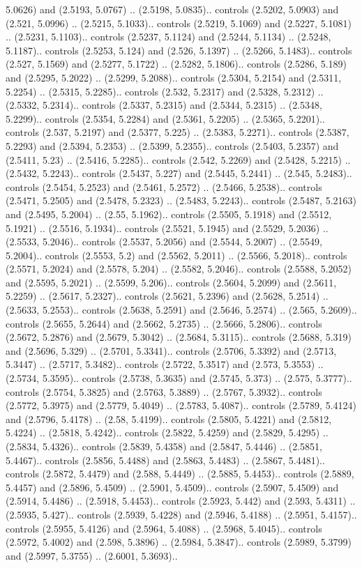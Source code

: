 5.0626) and (2.5193, 5.0767) .. (2.5198, 5.0835).. controls (2.5202, 5.0903) and (2.521, 5.0996) .. (2.5215, 5.1033).. controls (2.5219, 5.1069) and (2.5227, 5.1081) .. (2.5231, 5.1103).. controls (2.5237, 5.1124) and (2.5244, 5.1134) .. (2.5248, 5.1187).. controls (2.5253, 5.124) and (2.526, 5.1397) .. (2.5266, 5.1483).. controls (2.527, 5.1569) and (2.5277, 5.1722) .. (2.5282, 5.1806).. controls (2.5286, 5.189) and (2.5295, 5.2022) .. (2.5299, 5.2088).. controls (2.5304, 5.2154) and (2.5311, 5.2254) .. (2.5315, 5.2285).. controls (2.532, 5.2317) and (2.5328, 5.2312) .. (2.5332, 5.2314).. controls (2.5337, 5.2315) and (2.5344, 5.2315) .. (2.5348, 5.2299).. controls (2.5354, 5.2284) and (2.5361, 5.2205) .. (2.5365, 5.2201).. controls (2.537, 5.2197) and (2.5377, 5.225) .. (2.5383, 5.2271).. controls (2.5387, 5.2293) and (2.5394, 5.2353) .. (2.5399, 5.2355).. controls (2.5403, 5.2357) and (2.5411, 5.23) .. (2.5416, 5.2285).. controls (2.542, 5.2269) and (2.5428, 5.2215) .. (2.5432, 5.2243).. controls (2.5437, 5.227) and (2.5445, 5.2441) .. (2.545, 5.2483).. controls (2.5454, 5.2523) and (2.5461, 5.2572) .. (2.5466, 5.2538).. controls (2.5471, 5.2505) and (2.5478, 5.2323) .. (2.5483, 5.2243).. controls (2.5487, 5.2163) and (2.5495, 5.2004) .. (2.55, 5.1962).. controls (2.5505, 5.1918) and (2.5512, 5.1921) .. (2.5516, 5.1934).. controls (2.5521, 5.1945) and (2.5529, 5.2036) .. (2.5533, 5.2046).. controls (2.5537, 5.2056) and (2.5544, 5.2007) .. (2.5549, 5.2004).. controls (2.5553, 5.2) and (2.5562, 5.2011) .. (2.5566, 5.2018).. controls (2.5571, 5.2024) and (2.5578, 5.204) .. (2.5582, 5.2046).. controls (2.5588, 5.2052) and (2.5595, 5.2021) .. (2.5599, 5.206).. controls (2.5604, 5.2099) and (2.5611, 5.2259) .. (2.5617, 5.2327).. controls (2.5621, 5.2396) and (2.5628, 5.2514) .. (2.5633, 5.2553).. controls (2.5638, 5.2591) and (2.5646, 5.2574) .. (2.565, 5.2609).. controls (2.5655, 5.2644) and (2.5662, 5.2735) .. (2.5666, 5.2806).. controls (2.5672, 5.2876) and (2.5679, 5.3042) .. (2.5684, 5.3115).. controls (2.5688, 5.319) and (2.5696, 5.329) .. (2.5701, 5.3341).. controls (2.5706, 5.3392) and (2.5713, 5.3447) .. (2.5717, 5.3482).. controls (2.5722, 5.3517) and (2.573, 5.3553) .. (2.5734, 5.3595).. controls (2.5738, 5.3635) and (2.5745, 5.373) .. (2.575, 5.3777).. controls (2.5754, 5.3825) and (2.5763, 5.3889) .. (2.5767, 5.3932).. controls (2.5772, 5.3975) and (2.5779, 5.4049) .. (2.5783, 5.4087).. controls (2.5789, 5.4124) and (2.5796, 5.4178) .. (2.58, 5.4199).. controls (2.5805, 5.4221) and (2.5812, 5.4224) .. (2.5818, 5.4242).. controls (2.5822, 5.4259) and (2.5829, 5.4295) .. (2.5834, 5.4326).. controls (2.5839, 5.4358) and (2.5847, 5.4446) .. (2.5851, 5.4467).. controls (2.5856, 5.4488) and (2.5863, 5.4483) .. (2.5867, 5.4481).. controls (2.5872, 5.4479) and (2.588, 5.4449) .. (2.5885, 5.4453).. controls (2.5889, 5.4457) and (2.5896, 5.4509) .. (2.5901, 5.4509).. controls (2.5907, 5.4509) and (2.5914, 5.4486) .. (2.5918, 5.4453).. controls (2.5923, 5.442) and (2.593, 5.4311) .. (2.5935, 5.427).. controls (2.5939, 5.4228) and (2.5946, 5.4188) .. (2.5951, 5.4157).. controls (2.5955, 5.4126) and (2.5964, 5.4088) .. (2.5968, 5.4045).. controls (2.5972, 5.4002) and (2.598, 5.3896) .. (2.5984, 5.3847).. controls (2.5989, 5.3799) and (2.5997, 5.3755) .. (2.6001, 5.3693).. 